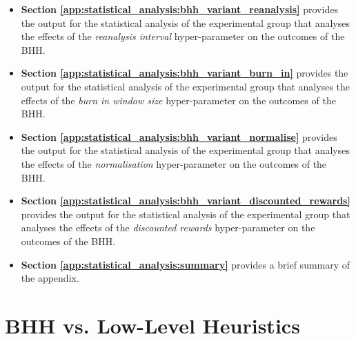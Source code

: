 \begin{itemize}
	\item \textbf{Section \ref{app:statistical_analysis:bhh_variant_reanalysis}} provides the output for the statistical analysis of the experimental group that analyses the effects of the \textit{reanalysis interval} hyper-parameter on the outcomes of the \acs{BHH}.

	\item \textbf{Section \ref{app:statistical_analysis:bhh_variant_burn_in}} provides the output for the statistical analysis of the experimental group that analyses the effects of the \textit{burn in window size} hyper-parameter on the outcomes of the \acs{BHH}.

	\item \textbf{Section \ref{app:statistical_analysis:bhh_variant_normalise}} provides the output for the statistical analysis of the experimental group that analyses the effects of the \textit{normalisation} hyper-parameter on the outcomes of the \acs{BHH}.

	\item \textbf{Section \ref{app:statistical_analysis:bhh_variant_discounted_rewards}} provides the output for the statistical analysis of the experimental group that analyses the effects of the \textit{discounted rewards} hyper-parameter on the outcomes of the \acs{BHH}.

	\item \textbf{Section \ref{app:statistical_analysis:summary}} provides a brief summary of the appendix.
\end{itemize}


\section{BHH vs. Low-Level Heuristics}\label{app:statistical_analysis:bhh_vs_low_level_heuristics}

\begin{table}[htbp]
	\centering
	\caption{ANOVA - Rank - BHH vs. Low-Level Heuristics}
	\label{tab:app:statistical_analysis:standalone:anova}%
	\par\bigskip
\end{table}




